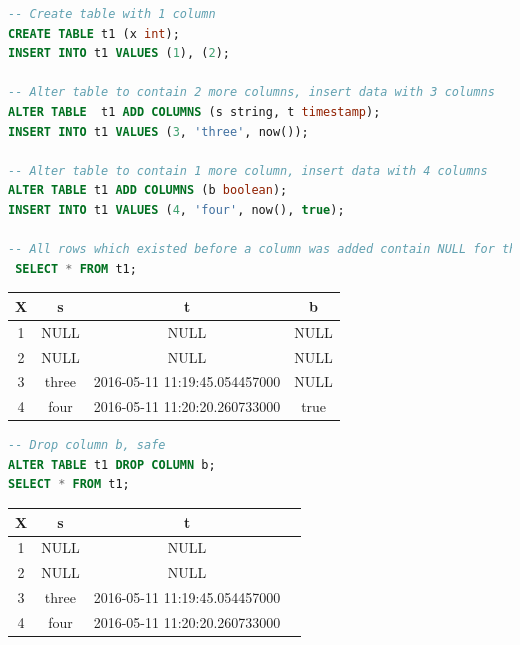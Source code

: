 \documentclass[onecolumn, draftclsnofoot,10pt, compsoc]{IEEEtran}
\begin{document}
    \begin{center}
    \begin{lstlisting}[language=SQL]
-- Create table with 1 column
CREATE TABLE t1 (x int);
INSERT INTO t1 VALUES (1), (2);

-- Alter table to contain 2 more columns, insert data with 3 columns
ALTER TABLE  t1 ADD COLUMNS (s string, t timestamp); 
INSERT INTO t1 VALUES (3, 'three', now()); 

-- Alter table to contain 1 more column, insert data with 4 columns
ALTER TABLE t1 ADD COLUMNS (b boolean);
INSERT INTO t1 VALUES (4, 'four', now(), true);

-- All rows which existed before a column was added contain NULL for those columns
 SELECT * FROM t1;
 \end{lstlisting}
\end{center}
\begin{center}
\begin{tabular}{|c|c|c|c|}
\hline
X & s & t & b \\
\hline
1 & NULL & NULL & NULL \\
\hline
2 & NULL & NULL & NULL \\
\hline
3 & three & 2016-05-11 11:19:45.054457000 & NULL \\
\hline
4 & four & 2016-05-11 11:20:20.260733000 & true \\
\hline
\end{tabular}
\end{center}

    \begin{center}
    \begin{lstlisting}[language=SQL]
-- Drop column b, safe
ALTER TABLE t1 DROP COLUMN b;
SELECT * FROM t1;
\end{lstlisting}
\end{center}

\begin{center}
\begin{tabular}{|c|c|c|c|}
\hline
X & s & t \\
\hline
1 & NULL & NULL \\
\hline
2 & NULL & NULL \\
\hline
3 & three & 2016-05-11 11:19:45.054457000 \\
\hline
4 & four & 2016-05-11 11:20:20.260733000 \\
\hline
\end{tabular}
\end{center}
\end{document}
